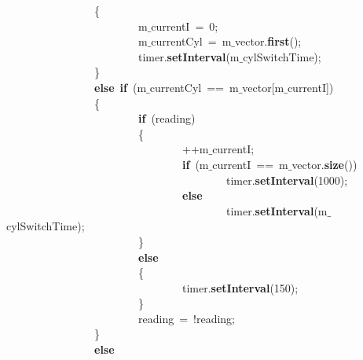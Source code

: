 \mbox{}\ \ \ \ \ \ \ \ \ \ \ \ \ \ \ \ \{ \\
\mbox{}\ \ \ \ \ \ \ \ \ \ \ \ \ \ \ \ \ \ \ \ \ \ \ \ m$\_$currentI\ =\ 0; \\
\mbox{}\ \ \ \ \ \ \ \ \ \ \ \ \ \ \ \ \ \ \ \ \ \ \ \ m$\_$currentCyl\ =\ m$\_$vector.\textbf{first}(); \\
\mbox{}\ \ \ \ \ \ \ \ \ \ \ \ \ \ \ \ \ \ \ \ \ \ \ \ timer.\textbf{setInterval}(m$\_$cylSwitchTime); \\
\mbox{}\ \ \ \ \ \ \ \ \ \ \ \ \ \ \ \ \} \\
\mbox{}\ \ \ \ \ \ \ \ \ \ \ \ \ \ \ \ \textbf{else}\ \textbf{if}\ (m$\_$currentCyl\ ==\ m$\_$vector[m$\_$currentI]) \\
\mbox{}\ \ \ \ \ \ \ \ \ \ \ \ \ \ \ \ \{ \\
\mbox{}\ \ \ \ \ \ \ \ \ \ \ \ \ \ \ \ \ \ \ \ \ \ \ \ \textbf{if}\ (reading) \\
\mbox{}\ \ \ \ \ \ \ \ \ \ \ \ \ \ \ \ \ \ \ \ \ \ \ \ \{ \\
\mbox{}\ \ \ \ \ \ \ \ \ \ \ \ \ \ \ \ \ \ \ \ \ \ \ \ \ \ \ \ \ \ \ \ ++m$\_$currentI; \\
\mbox{}\ \ \ \ \ \ \ \ \ \ \ \ \ \ \ \ \ \ \ \ \ \ \ \ \ \ \ \ \ \ \ \ \textbf{if}\ (m$\_$currentI\ ==\ m$\_$vector.\textbf{size}()) \\
\mbox{}\ \ \ \ \ \ \ \ \ \ \ \ \ \ \ \ \ \ \ \ \ \ \ \ \ \ \ \ \ \ \ \ \ \ \ \ \ \ \ \ timer.\textbf{setInterval}(1000); \\
\mbox{}\ \ \ \ \ \ \ \ \ \ \ \ \ \ \ \ \ \ \ \ \ \ \ \ \ \ \ \ \ \ \ \ \textbf{else} \\
\mbox{}\ \ \ \ \ \ \ \ \ \ \ \ \ \ \ \ \ \ \ \ \ \ \ \ \ \ \ \ \ \ \ \ \ \ \ \ \ \ \ \ timer.\textbf{setInterval}(m$\_$cylSwitchTime); \\
\mbox{}\ \ \ \ \ \ \ \ \ \ \ \ \ \ \ \ \ \ \ \ \ \ \ \ \} \\
\mbox{}\ \ \ \ \ \ \ \ \ \ \ \ \ \ \ \ \ \ \ \ \ \ \ \ \textbf{else} \\
\mbox{}\ \ \ \ \ \ \ \ \ \ \ \ \ \ \ \ \ \ \ \ \ \ \ \ \{ \\
\mbox{}\ \ \ \ \ \ \ \ \ \ \ \ \ \ \ \ \ \ \ \ \ \ \ \ \ \ \ \ \ \ \ \ timer.\textbf{setInterval}(150); \\
\mbox{}\ \ \ \ \ \ \ \ \ \ \ \ \ \ \ \ \ \ \ \ \ \ \ \ \} \\
\mbox{}\ \ \ \ \ \ \ \ \ \ \ \ \ \ \ \ \ \ \ \ \ \ \ \ reading\ =\ !reading; \\
\mbox{}\ \ \ \ \ \ \ \ \ \ \ \ \ \ \ \ \} \\
\mbox{}\ \ \ \ \ \ \ \ \ \ \ \ \ \ \ \ \textbf{else} \\
